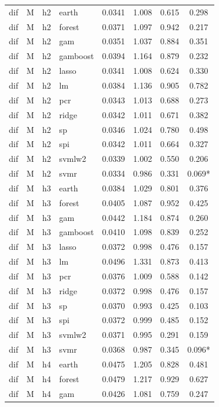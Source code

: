 \begin{ThreePartTable}
\begin{longtable}[t]{llclcccc}
\addlinespace
dif & M & h2 & earth & 0.0341 & 1.008 & 0.615 & 0.298\\
dif & M & h2 & forest & 0.0371 & 1.097 & 0.942 & 0.217\\
dif & M & h2 & gam & 0.0351 & 1.037 & 0.884 & 0.351\\
dif & M & h2 & gamboost & 0.0394 & 1.164 & 0.879 & 0.232\\
dif & M & h2 & lasso & 0.0341 & 1.008 & 0.624 & 0.330\\
dif & M & h2 & lm & 0.0384 & 1.136 & 0.905 & 0.782\\
dif & M & h2 & pcr & 0.0343 & 1.013 & 0.688 & 0.273\\
dif & M & h2 & ridge & 0.0342 & 1.011 & 0.671 & 0.382\\
dif & M & h2 & sp & 0.0346 & 1.024 & 0.780 & 0.498\\
dif & M & h2 & spi & 0.0342 & 1.011 & 0.664 & 0.327\\
dif & M & h2 & svmlw2 & 0.0339 & 1.002 & 0.550 & 0.206\\
dif & M & h2 & svmr & 0.0334 & 0.986 & 0.331 & 0.069*\\
\addlinespace
dif & M & h3 & earth & 0.0384 & 1.029 & 0.801 & 0.376\\
dif & M & h3 & forest & 0.0405 & 1.087 & 0.952 & 0.425\\
dif & M & h3 & gam & 0.0442 & 1.184 & 0.874 & 0.260\\
dif & M & h3 & gamboost & 0.0410 & 1.098 & 0.839 & 0.252\\
dif & M & h3 & lasso & 0.0372 & 0.998 & 0.476 & 0.157\\
dif & M & h3 & lm & 0.0496 & 1.331 & 0.873 & 0.413\\
dif & M & h3 & pcr & 0.0376 & 1.009 & 0.588 & 0.142\\
dif & M & h3 & ridge & 0.0372 & 0.998 & 0.476 & 0.157\\
dif & M & h3 & sp & 0.0370 & 0.993 & 0.425 & 0.103\\
dif & M & h3 & spi & 0.0372 & 0.999 & 0.485 & 0.152\\
dif & M & h3 & svmlw2 & 0.0371 & 0.995 & 0.291 & 0.159\\
dif & M & h3 & svmr & 0.0368 & 0.987 & 0.345 & 0.096*\\
\addlinespace
dif & M & h4 & earth & 0.0475 & 1.205 & 0.828 & 0.481\\
dif & M & h4 & forest & 0.0479 & 1.217 & 0.929 & 0.627\\
dif & M & h4 & gam & 0.0426 & 1.081 & 0.759 & 0.247\\

\end{longtable}
\end{ThreePartTable}

